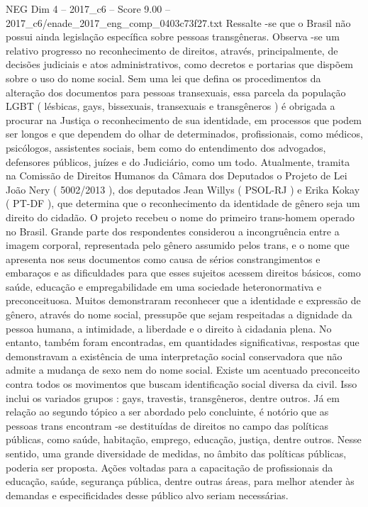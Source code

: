 \begin{textsample}{NEG Dim 4 – 2017\_c6 – Score 9.00 – 2017\_c6/enade\_2017\_eng\_comp\_0403c73f27.txt}
Ressalte -se que o Brasil não possui ainda legislação específica sobre pessoas transgêneras.
Observa -se um relativo progresso no reconhecimento de direitos, através, principalmente, de decisões judiciais e atos administrativos, como decretos e portarias que dispõem sobre o uso do nome social.
Sem uma lei que defina os procedimentos da alteração dos documentos para pessoas transexuais, essa parcela da população LGBT ( lésbicas, gays, bissexuais, transexuais e transgêneros ) é obrigada a procurar na Justiça o reconhecimento de sua identidade, em processos que podem ser longos e que dependem do olhar de determinados, profissionais, como médicos, psicólogos, assistentes sociais, bem como do entendimento dos advogados, defensores públicos, juízes e do Judiciário, como um todo.
Atualmente, tramita na Comissão de Direitos Humanos da Câmara dos Deputados o Projeto de Lei João Nery ( 5002/2013 ), dos deputados Jean Willys ( PSOL-RJ ) e Erika Kokay ( PT-DF ), que determina que o reconhecimento da identidade de gênero seja um direito do cidadão.
O projeto recebeu o nome do primeiro trans-homem operado no Brasil.
Grande parte dos respondentes considerou a incongruência entre a imagem corporal, representada pelo gênero assumido pelos trans, e o nome que apresenta nos seus documentos como causa de sérios constrangimentos e embaraços e as dificuldades para que esses sujeitos acessem direitos básicos, como saúde, educação e empregabilidade em uma sociedade heteronormativa e preconceituosa.
Muitos demonstraram reconhecer que a identidade e expressão de gênero, através do nome social, pressupõe que sejam respeitadas a dignidade da pessoa humana, a intimidade, a liberdade e o direito à cidadania plena.
No entanto, também foram encontradas, em quantidades significativas, respostas que demonstravam a existência de uma interpretação social conservadora que não admite a mudança de sexo nem do nome social.
Existe um acentuado preconceito contra todos os movimentos que buscam identificação social diversa da civil.
Isso inclui os variados grupos : gays, travestis, transgêneros, dentre outros.
Já em relação ao segundo tópico a ser abordado pelo concluinte, é notório que as pessoas trans encontram -se destituídas de direitos no campo das políticas públicas, como saúde, habitação, emprego, educação, justiça, dentre outros.
Nesse sentido, uma grande diversidade de medidas, no âmbito das políticas públicas, poderia ser proposta.
Ações voltadas para a capacitação de profissionais da educação, saúde, segurança pública, dentre outras áreas, para melhor atender às demandas e especificidades desse público alvo seriam necessárias.

\end{textsample}
